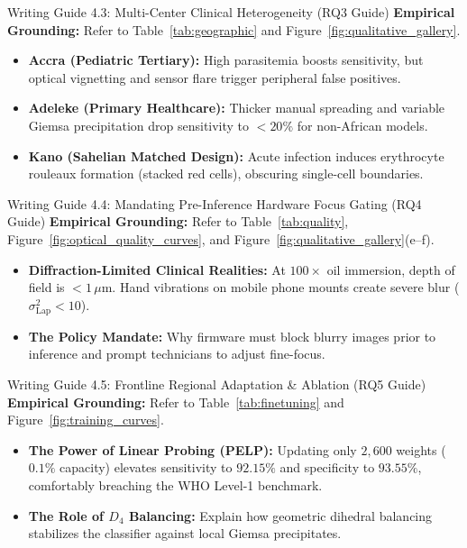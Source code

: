 \documentclass[a4paper,11pt]{article}
\begin{document}
\begin{guidebox}{Writing Guide 4.3: Multi-Center Clinical Heterogeneity (RQ3 Guide)}
\textbf{Empirical Grounding:} Refer to Table~\ref{tab:geographic} and Figure~\ref{fig:qualitative_gallery}.
\begin{itemize}\itemsep1.5pt
    \item \textbf{Accra (Pediatric Tertiary):} High parasitemia boosts sensitivity, but optical vignetting and sensor flare trigger peripheral false positives.
    \item \textbf{Adeleke (Primary Healthcare):} Thicker manual spreading and variable Giemsa precipitation drop sensitivity to $<20\%$ for non-African models.
    \item \textbf{Kano (Sahelian Matched Design):} Acute infection induces erythrocyte rouleaux formation (stacked red cells), obscuring single-cell boundaries.
\end{itemize}
\end{guidebox}

\begin{guidebox}{Writing Guide 4.4: Mandating Pre-Inference Hardware Focus Gating (RQ4 Guide)}
\textbf{Empirical Grounding:} Refer to Table~\ref{tab:quality}, Figure~\ref{fig:optical_quality_curves}, and Figure~\ref{fig:qualitative_gallery}(e--f).
\begin{itemize}\itemsep1.5pt
    \item \textbf{Diffraction-Limited Clinical Realities:} At $100\times$ oil immersion, depth of field is $<1\,\mu\text{m}$. Hand vibrations on mobile phone mounts create severe blur ($\sigma^2_{\text{Lap}} < 10$).
    \item \textbf{The Policy Mandate:} Why firmware must block blurry images prior to inference and prompt technicians to adjust fine-focus.
\end{itemize}
\end{guidebox}

\begin{guidebox}{Writing Guide 4.5: Frontline Regional Adaptation \& Ablation (RQ5 Guide)}
\textbf{Empirical Grounding:} Refer to Table~\ref{tab:finetuning} and Figure~\ref{fig:training_curves}.
\begin{itemize}\itemsep1.5pt
    \item \textbf{The Power of Linear Probing (PELP):} Updating only $2,600$ weights ($0.1\%$ capacity) elevates sensitivity to $92.15\%$ and specificity to $93.55\%$, comfortably breaching the WHO Level-1 benchmark.
    \item \textbf{The Role of $D_4$ Balancing:} Explain how geometric dihedral balancing stabilizes the classifier against local Giemsa precipitates.
\end{itemize}
\end{guidebox}
\end{document}
